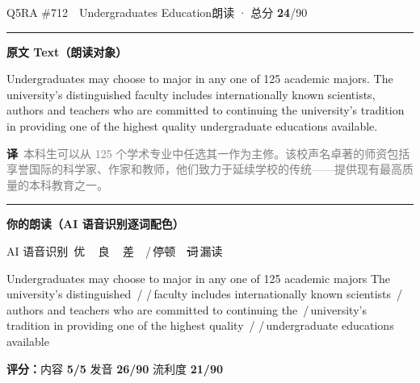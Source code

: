 \documentclass[11pt]{article}
\newcommand{\sfull}[1]{\textcolor{cFix}{\bfseries #1}}     %
\newcommand{\spart}[1]{\textcolor{cPartial}{\bfseries #1}} %
\newcommand{\ptesub}[1]{%
  \par\needspace{2\baselineskip}\smallskip
  {\color{cAccent}\rule[-0.2ex]{3pt}{1.05em}}\hspace{6pt}%
  {\bfseries\color{cHead}#1}\par\nopagebreak\smallskip}
\newcommand{\sg}[1]{\textcolor{cSpkGood}{#1}}   %
\newcommand{\sy}[1]{\textcolor{cSpkOk}{#1}}     %
\newcommand{\sr}[1]{\textcolor{cSpkBad}{#1}}    %
\newcommand{\pse}{{\color{gray}\,/\,}}          %
\newcommand{\asrlegend}{{\footnotesize\color{gray}AI 语音识别\quad
  {\color{cSpkGood}\textbullet}\,优\ \ {\color{cSpkOk}\textbullet}\,良\ \
  {\color{cSpkBad}\textbullet}\,差\ \ {\color{gray}/}\,停顿\ \
  {\color{cSpkBad}\sout{词}}\,漏读}}
\newcommand{\zh}[1]{{\footnotesize\textcolor{cNote}{\textbf{译}}\ \textcolor{gray}{#1}}}
\begin{document}
\begin{qblock}{Q5\quad RA \#712\ \ Undergraduates Education}{朗读 · 总分 \textcolor{cAccent}{\bfseries 24}/90}
\ptesub{原文 Text（朗读对象）}
\begin{promptbox}
Undergraduates may choose to major in any one of 125 academic majors. The university's distinguished faculty includes internationally known scientists, authors and teachers who are committed to continuing the university's tradition in providing one of the highest quality undergraduate educations available.
\end{promptbox}
\zh{本科生可以从 125 个学术专业中任选其一作为主修。该校声名卓著的师资包括享誉国际的科学家、作家和教师，他们致力于延续学校的传统——提供现有最高质量的本科教育之一。}
\ptesub{你的朗读（AI 语音识别逐词配色）}
\asrlegend
\begin{asrbox}
\sy{Undergraduates} \sg{may} \sg{choose} \sg{to} \sg{major} \sg{in} \sg{any} \sg{one} \sg{of} \sg{125} \sg{academic} \sg{majors} \sg{The} \sg{university's} \sy{distinguished} \pse \pse \sr{faculty} \sg{includes} \sg{internationally} \sy{known} \sg{scientists} \pse \sg{authors} \sg{and} \sg{teachers} \sg{who} \sg{are} \sg{committed} \sg{to} \sy{continuing} \sg{the} \pse \sg{university's} \sg{tradition} \sg{in} \sg{providing} \sg{one} \sg{of} \sg{the} \sy{highest} \sy{quality} \pse \pse \sy{undergraduate} \sg{educations} \sg{available}
\end{asrbox}
\smallskip
{\small\textbf{评分：}内容 \sfull{5/5} \quad\textperiodcentered\quad 发音 \spart{26/90} \quad\textperiodcentered\quad 流利度 \spart{21/90}}\quad{\footnotesize\color{gray}（用时 01:06）}
\end{qblock}
\end{document}
